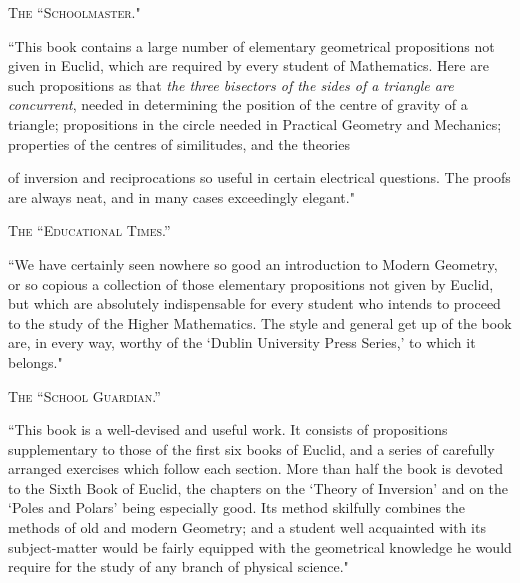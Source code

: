 \documentclass[oneside]{book}
\begin{document}
\bigskip
\begin{center}
\textsc{The ``Schoolmaster."}
\end{center}
\nopagebreak

\begin{footnotesize}
``This book contains a large number of elementary geometrical
propositions not given in Euclid, which are required by every
student of Mathematics. Here are such propositions as that \textit{the
three bisectors of the sides of a triangle are concurrent}, needed in
determining the position of the centre of gravity of a triangle;
propositions in the circle needed in Practical Geometry and Mechanics;
properties of the centres of similitudes, and the theories

of inversion and reciprocations so useful in certain electrical questions.
The proofs are always neat, and in many cases exceedingly
elegant."
\end{footnotesize}

\bigskip
\begin{center}
\textsc{The ``Educational Times.''}
\end{center}
\nopagebreak

\begin{footnotesize}
``We have certainly seen nowhere so good an introduction to
Modern Geometry, or so copious a collection of those elementary
propositions not given by Euclid, but which are absolutely indispensable
for every student who intends to proceed to the study of
the Higher Mathematics. The style and general get up of the
book are, in every way, worthy of the `Dublin University Press
Series,' to which it belongs."
\end{footnotesize}

\bigskip
\begin{center}
\textsc{The ``School Guardian.''}
\end{center}
\nopagebreak

\begin{footnotesize}
``This book is a well-devised and useful work. It consists of
propositions supplementary to those of the first six books of
Euclid, and a series of carefully arranged exercises which follow
each section. More than half the book is devoted to the Sixth
Book of Euclid, the chapters on the `Theory of Inversion' and
on the `Poles and Polars' being especially good. Its method
skilfully combines the methods of old and modern Geometry; and
a student well acquainted with its subject-matter would be fairly
equipped with the geometrical knowledge he would require for
the study of any branch of physical science."
\end{footnotesize}
\end{document}

